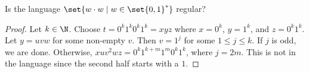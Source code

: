 \begin{problem}
    Is the language $\set{w \cdot w \mid w \in \set{0, 1}^*}$ regular?
\end{problem}
\begin{proof}
    Let $k \in \N$.
    Choose $t = 0^k 1^k 0^k 1^k = xyz$ where $x = 0^k$, $y = 1^k$, and
    $z = 0^k 1^k$.
    Let $y = uvw$ for some non-empty $v$.
    Then $v = 1^j$ for some $1 \le j \le k$.
    If $j$ is odd, we are done.
    Otherwise, $x u v^2 w z = 0^k 1^{k + m} 1^m 0^k 1^k$, where $j = 2m$.
    This is not in the language since the second half starts with a $1$.
\end{proof}

